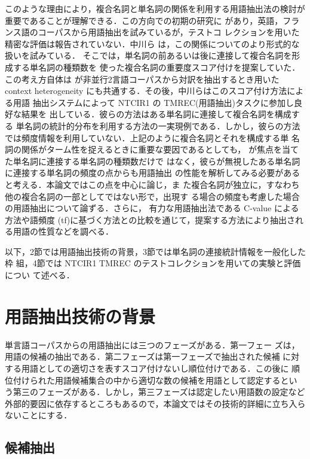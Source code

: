 このような理由により，複合名詞と単名詞の関係を利用する用語抽出法の検討が
重要であることが理解できる．この方向での初期の研究に\cite{Enguehard95}
があり，英語，フランス語のコーパスから用語抽出を試みているが，テストコ
レクションを用いた精密な評価は報告されていない．中川ら
\cite{NakagawaMori98}は，この関係についてのより形式的な扱いを試みている．
そこでは，単名詞の前あるいは後に連接して複合名詞を形成する単名詞の種類数を
使った複合名詞の重要度スコア付けを提案していた．この考え方自体は
\cite{Fung95}が非並行2言語コーパスから対訳を抽出するとき用いた context
heterogeneity にも共通する．その後，中川らはこのスコア付け方法による用語
抽出システムによって NTCIR1 の TMREC(用語抽出)タスクに参加し良好な結果を
出している．彼らの方法はある単名詞に連接して複合名詞を構成する
単名詞の統計的分布を利用する方法の一実現例である．しかし，彼らの方法
では頻度情報を利用していない．上記のように複合名詞とそれを構成する単
名詞の関係がターム性を捉えるときに重要な要因であるとしても，
\cite{NakagawaMori98}が焦点を当てた単名詞に連接する単名詞の種類数だけで
はなく，彼らが無視したある単名詞に連接する単名詞の頻度の点からも用語抽出
の性能を解析してみる必要があると考える．本論文ではこの点を中心に論じ，ま
た複合名詞が独立に，すなわち他の複合名詞の一部としてではない形で，出現す
る場合の頻度も考慮した場合の用語抽出について論ずる．さらに，
有力な用語抽出法である C-value による方法\cite{FrantziAnaniadou96}や語頻度
(tf)に基づく方法との比較を通じて，提案する方法により抽出される用語の性質などを調べる．

以下，2節では用語抽出技術の背景，3節では単名詞の連接統計情報を一般化した枠
組，4節では NTCIR1 TMREC のテストコレクションを用いての実験と評価につい
て述べる．
\section{用語抽出技術の背景}

単言語コーパスからの用語抽出には三つのフェーズがある．第一フェー
ズは，用語の候補の抽出である．第二フェーズは第一フェーズで抽出された候補
に対する用語としての適切さを表すスコア付けないし順位付けである．この後に
順位付けられた用語候補集合の中から適切な数の候補を用語として認定するとい
う第三のフェーズがある．しかし，第三フェーズは認定したい用語数の設定など
外部的要因に依存するところもあるので，本論文ではその技術的詳細に立ち入ら
ないことにする．


\subsection{候補抽出}

